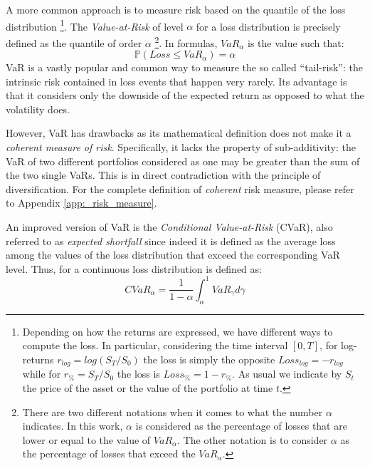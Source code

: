 A more common approach is to measure risk based on the quantile of the loss distribution \footnote{Depending on how the returns are expressed, we have different ways to compute the loss. In particular, considering the time interval $[0, T]$, for log-returns $r_{log}=log(S_T/S_0)$ the loss is simply the opposite $Loss_{log} = - r_{log}$ while for $r_\% = S_T/S_0$  the loss is $Loss_\% = 1 - r_\%$. As usual we indicate by $S_t$ the price  of the asset or the value of the portfolio at time $t$.}. The \textit{Value-at-Risk} of level $\alpha$ for a loss distribution is precisely defined as the quantile of order $\alpha$ \footnote{ There are two different notations when it comes to what the number $\alpha$ indicates. In this work, $\alpha$ is considered as the percentage of losses that are lower or equal to the value of $VaR_\alpha$. The other notation is to consider $\alpha$ as the percentage of losses that exceed the $VaR_\alpha$. }.  In formulas, $VaR_\alpha$ is the value such that:
\begin{equation}
\mathbb{P}(Loss \leq VaR_\alpha) = \alpha
\end{equation}
VaR is a vastly popular and common way to measure the so called ``tail-risk'': the intrinsic risk contained in loss events that happen very rarely. 
Its advantage is that it considers only the downside of the expected return as opposed to what the volatility does.

However, VaR has drawbacks as its mathematical definition does not make it a \textit{coherent measure of risk}. Specifically, it lacks the property of sub-additivity: the VaR of two different portfolios  considered as one may be greater than the sum of the two single VaRs. This is in direct contradiction with the principle of diversification.
For the complete definition of \textit{coherent} risk measure, please refer to Appendix \ref{app:_risk_measure}.

\bigskip
An improved version of VaR is the \textit{Conditional Value-at-Risk} (CVaR), also referred to as \textit{expected shortfall} since indeed it is defined as the average loss among the values of the loss distribution that exceed the corresponding VaR level. Thus, for a continuous loss distribution is defined as:
\begin{equation}
	CVaR_\alpha = \frac{1}{1-\alpha} \int_{\alpha}^{1} VaR_\gamma d\gamma 
\end{equation}


